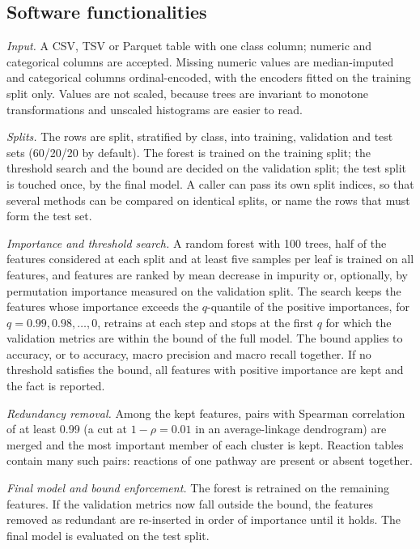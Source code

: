 \documentclass[11pt,a4paper]{article}
\begin{document}
\subsection{Software functionalities}

\emph{Input.} A CSV, TSV or Parquet table with one class column; numeric and categorical columns are accepted. Missing numeric values are median-imputed and categorical columns ordinal-encoded, with the encoders fitted on the training split only. Values are not scaled, because trees are invariant to monotone transformations and unscaled histograms are easier to read.

\emph{Splits.} The rows are split, stratified by class, into training, validation and test sets (60/20/20 by default). The forest is trained on the training split; the threshold search and the bound are decided on the validation split; the test split is touched once, by the final model. A caller can pass its own split indices, so that several methods can be compared on identical splits, or name the rows that must form the test set.

\emph{Importance and threshold search.} A random forest with 100 trees, half of the features considered at each split and at least five samples per leaf is trained on all features, and features are ranked by mean decrease in impurity \cite{louppe2013} or, optionally, by permutation importance measured on the validation split. The search keeps the features whose importance exceeds the $q$-quantile of the positive importances, for $q = 0.99, 0.98, \ldots, 0$, retrains at each step and stops at the first $q$ for which the validation metrics are within the bound of the full model. The bound applies to accuracy, or to accuracy, macro precision and macro recall together. If no threshold satisfies the bound, all features with positive importance are kept and the fact is reported.

\emph{Redundancy removal.} Among the kept features, pairs with Spearman correlation of at least 0.99 (a cut at $1 - \rho = 0.01$ in an average-linkage dendrogram) are merged and the most important member of each cluster is kept. Reaction tables contain many such pairs: reactions of one pathway are present or absent together.

\emph{Final model and bound enforcement.} The forest is retrained on the remaining features. If the validation metrics now fall outside the bound, the features removed as redundant are re-inserted in order of importance until it holds. The final model is evaluated on the test split.
\end{document}

